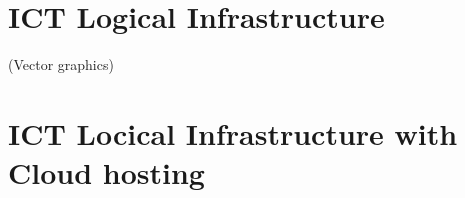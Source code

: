 \chapter{ICT Logical Infrastructure}\label{app:ICT}
(Vector graphics)
\begin{landscape}

\end{landscape}


\chapter{ICT Locical Infrastructure with Cloud hosting}\label{app:ICT-Cloud}
\begin{landscape}

\end{landscape}